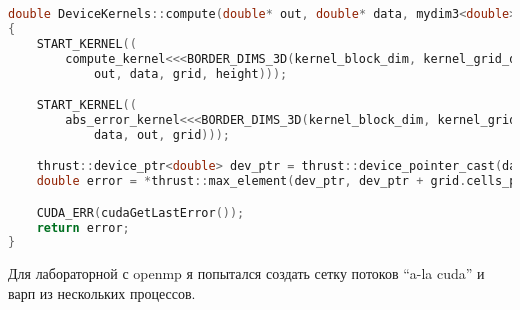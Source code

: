 \documentclass[12pt]{article}
\begin{document}
\begin{lstlisting}[language=c++,basicstyle=\scriptsize]
double DeviceKernels::compute(double* out, double* data, mydim3<double> height)
{
    START_KERNEL((
        compute_kernel<<<BORDER_DIMS_3D(kernel_block_dim, kernel_grid_dim)>>>(
            out, data, grid, height)));

    START_KERNEL((
        abs_error_kernel<<<BORDER_DIMS_3D(kernel_block_dim, kernel_grid_dim)>>>(
            data, out, grid)));

    thrust::device_ptr<double> dev_ptr = thrust::device_pointer_cast(data);
    double error = *thrust::max_element(dev_ptr, dev_ptr + grid.cells_per_block());

    CUDA_ERR(cudaGetLastError());
    return error;
}
\end{lstlisting}

Для лабораторной с openmp я попытался создать сетку потоков ``a-la cuda'' и варп из нескольких процессов.
\end{document}
